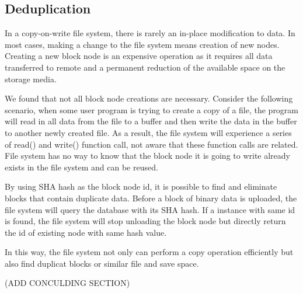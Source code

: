 \subsection{Deduplication}

    In a copy-on-write file system, there is rarely an in-place modification to data. In most cases, making a change to the file system means creation of new nodes. Creating a new block node is an expensive operation as it requires all data transferred to remote and a permanent reduction of the available space on the storage media.
    
    We found that not all block node creations are necessary. Consider the following scenario, when some user program is trying to create a copy of a file, the program will read in all data from the file to a buffer and then write the data in the buffer to another newly created file. As a result, the file system will experience a series of read() and write() function call, not aware that these function calls are related. File system has no way to know that the block node it is going to write already exists in the file system and can be reused.

    By using SHA hash as the block node id, it is possible to find and eliminate blocks that contain duplicate data. Before a block of binary data is uploaded, the file system will query the database with its SHA hash. If a instance with same id is found, the file system will stop unloading the block node but directly return the id of existing node with same hash value.

    In this way, the file system not only can perform a copy operation efficiently but also find duplicat blocks or similar file and save space. 

    (ADD CONCULDING SECTION)
